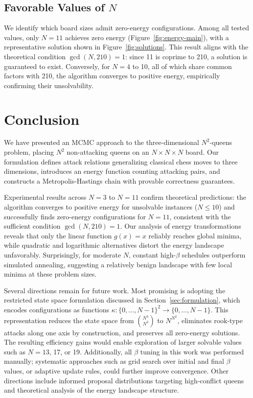 \documentclass[10pt,twocolumn,a4paper]{article}
\theoremstyle{definition}
\theoremstyle{remark}
\begin{document}
\subsection{Favorable Values of $N$}
We identify which board sizes admit zero-energy configurations. Among all tested values, only $N=11$ achieves zero energy (Figure~\ref{fig:energy-main}), with a representative solution shown in Figure~\ref{fig:solutions}. This result aligns with the theoretical condition $\gcd(N,210)=1$: since 11 is coprime to 210, a solution is guaranteed to exist. Conversely, for $N=4$ to 10, all of which share common factors with 210, the algorithm converges to positive energy, empirically confirming their unsolvability.

\section{Conclusion}\label{sec:conclusion}
We have presented an MCMC approach to the three-dimensional $N^2$-queens problem, placing $N^2$ non-attacking queens on an $N\times N\times N$ board. Our formulation defines attack relations generalizing classical chess moves to three dimensions, introduces an energy function counting attacking pairs, and constructs a Metropolis-Hastings chain with provable correctness guarantees.

Experimental results across $N=3$ to $N=11$ confirm theoretical predictions: the algorithm converges to positive energy for unsolvable instances ($N\le10$) and successfully finds zero-energy configurations for $N=11$, consistent with the sufficient condition $\gcd(N,210)=1$. Our analysis of energy transformations reveals that only the linear function $g(x)=x$ reliably reaches global minima, while quadratic and logarithmic alternatives distort the energy landscape unfavorably. Surprisingly, for moderate $N$, constant high-$\beta$ schedules outperform simulated annealing, suggesting a relatively benign landscape with few local minima at these problem sizes.

Several directions remain for future work. Most promising is adopting the restricted state space formulation discussed in Section~\ref{sec:formulation}, which encodes configurations as functions $\kappa:\{0,\ldots,N-1\}^2\to\{0,\ldots,N-1\}$. This representation reduces the state space from $\binom{N^3}{N^2}$ to $N^{N^2}$, eliminates rook-type attacks along one axis by construction, and preserves all zero-energy solutions. The resulting efficiency gains would enable exploration of larger solvable values such as $N=13$, 17, or 19. Additionally, all $\beta$ tuning in this work was performed manually; systematic approaches such as grid search over initial and final $\beta$ values, or adaptive update rules, could further improve convergence. Other directions include informed proposal distributions targeting high-conflict queens and theoretical analysis of the energy landscape structure.
\end{document}
